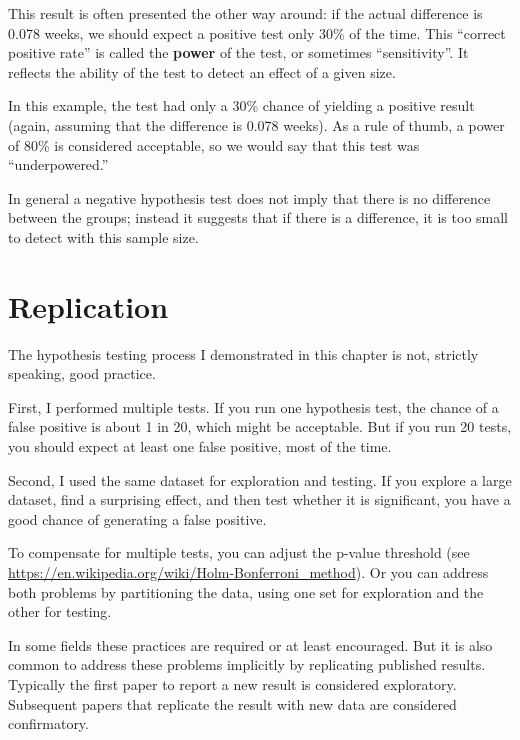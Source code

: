 \documentclass[12pt]{book}
\theoremstyle{exercise}
\begin{document}
This result is often presented the other way around: if the actual
difference is 0.078 weeks, we should expect a positive test only 30\%
of the time.  This ``correct positive rate'' is called the {\bf power}
of the test, or sometimes ``sensitivity''.  It reflects the ability of
the test to detect an effect of a given size.%
%
%

In this example, the test had only a 30\% chance of yielding a
positive result (again, assuming that the difference is 0.078 weeks).
As a rule of thumb, a power of 80\% is considered acceptable, so
we would say that this test was ``underpowered.''%

In general a negative hypothesis test does not imply that there is no
difference between the groups; instead it suggests that if there is a
difference, it is too small to detect with this sample size.


\section{Replication}%
\label{replication}

The hypothesis testing process I demonstrated in this chapter is not,
strictly speaking, good practice.

First, I performed multiple tests.  If you run one hypothesis test,
the chance of a false positive is about 1 in 20, which might be
acceptable.  But if you run 20 tests, you should expect at least one
false positive, most of the time.%

Second, I used the same dataset for exploration and testing.  If
you explore a large dataset, find a surprising effect, and then test
whether it is significant, you have a good chance of generating a
false positive.%
%

To compensate for multiple tests, you can adjust the p-value
threshold (see
  \url{https://en.wikipedia.org/wiki/Holm-Bonferroni_method}).  Or you
can address both problems by partitioning the data, using one set for
exploration and the other for testing.%
%

In some fields these practices are required or at least encouraged.
But it is also common to address these problems implicitly by
replicating published results.  Typically the first paper to report a
new result is considered exploratory.  Subsequent papers that
replicate the result with new data are considered confirmatory.%
\end{document}
